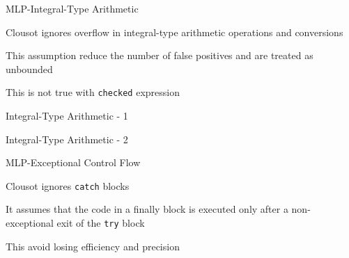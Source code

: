 
\begin{frame}{MLP-Integral-Type Arithmetic}

\vspace*{-0.4cm}

Clousot ignores overflow in integral-type arithmetic operations and conversions

\vspace*{0.6cm}

This assumption reduce the number of false positives and are treated as
unbounded

\vspace*{0.6cm}

This is not true with \texttt{checked} expression

\end{frame}


\begin{frame}[fragile]{Integral-Type Arithmetic - 1}
\vspace*{-0.4cm}
\only<1>{}
\end{frame}


\begin{frame}[fragile]{Integral-Type Arithmetic - 2}
\vspace*{-0.4cm}
\only<1>{}
\end{frame}


\begin{frame}{MLP-Exceptional Control Flow}

\vspace*{-0.4cm}

Clousot ignores \texttt{catch} blocks 

\vspace*{0.6cm}

It assumes that the code in a finally block is executed only after a
non-exceptional exit of the \texttt{try} block

\vspace*{0.6cm}

This avoid losing efficiency and precision

\end{frame}


